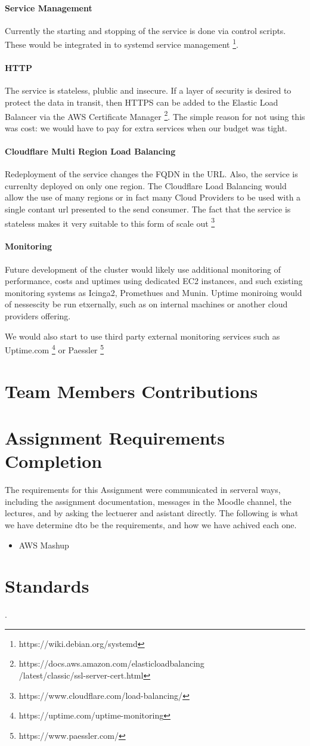\documentclass[conference]{IEEEtran}
\begin{document}
\paragraph{Service Management}
Currently the starting and stopping of the service is done via control scripts. These would be integrated in to systemd service management \footnote{https://wiki.debian.org/systemd}.
\paragraph{HTTP}
The service is stateless, plublic and insecure. If a layer of security is desired to protect the data in transit, then HTTPS can be added to the Elastic Load Balancer via the AWS Certificate Manager \footnote{https://docs.aws.amazon.com/elasticloadbalancing\\/latest/classic/ssl-server-cert.html}. The simple reason for not using this was cost: we would have to pay for extra services when our budget was tight.
\paragraph{Cloudflare Multi Region Load Balancing}
Redeployment of the service changes the FQDN in the URL. Also, the service is currenlty deployed on only one region. The Cloudflare Load Balancing would allow the use of many regions or in fact many Cloud Providers to be used with a single contant url presented to the send consumer. The fact that the service is stateless makes it very suitable to this form of scale out \footnote{https://www.cloudflare.com/load-balancing/}
\paragraph{Monitoring}
Future development of the cluster would likely use additional monitoring of performance, costs and uptimes using dedicated EC2 instances, and such existing monitoring systems as Icinga2, Promethues and Munin. Uptime moniroing would of nessescity be run etxernally, such as on internal machines or another cloud providers offering. \par
We would also start to use third party external monitoring services such as Uptime.com \footnote{https://uptime.com/uptime-monitoring} or Paessler \footnote{https://www.paessler.com/}
\section{Team Members Contributions}
\section{Assignment Requirements Completion}
The requirements for this Assignment were communicated in serveral ways, including the assignment documentation, messages in the Moodle channel, the lectures, and by asking the lectuerer and asistant directly. The following is what we have determine dto be the requirements, and how we have achived each one.
\begin{itemize}
  \item AWS Mashup
\end{itemize}
\section{Standards}

.
\end{document}
